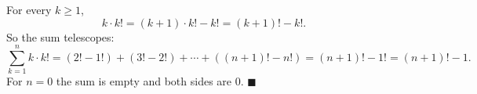 For every $k\ge1$,
\[k\cdot k!=(k+1)\cdot k!-k!=(k+1)!-k!.\]
So the sum telescopes:
\[\sum_{k=1}^{n}k\cdot k!=\left(2!-1!\right)+\left(3!-2!\right)+\cdots+\left((n+1)!-n!\right)=(n+1)!-1!=(n+1)!-1.\]
For $n=0$ the sum is empty and both sides are $0$. $\blacksquare$
